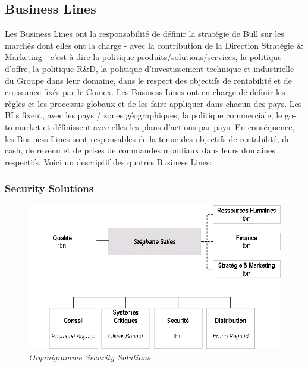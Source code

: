 \documentclass[11pt]{article}
\begin{document}
		\subsection{Business Lines}
		Les Business Lines ont la responsabilité de définir la stratégie de Bull sur les marchés 
		dont elles ont la charge - avec la contribution de la Direction Stratégie \& Marketing - 
		c’est-à-dire la politique produits/solutions/services, la politique d’offre, la politique R\&D, 
		la politique  d’investissement technique et industrielle du Groupe dans leur domaine, 
		dans le respect des objectifs de rentabilité et de croissance fixés par le Comex. \newline
		Les Business Lines ont en charge de définir les règles et les processus globaux et de les 
		faire appliquer dans chacun des pays. \newline
		Les BLs fixent, avec les pays / zones géographiques, la politique commerciale, le go-to-market et définissent avec 
		elles les plans d’actions par pays. \newline
		En conséquence, les Business Lines sont responsables de la tenue des objectifs de 
		rentabilité, de cash, de revenu et de prises de commandes mondiaux dans leurs 
		domaines respectifs. \newline
		Voici un descriptif des quatres Business Lines:

		\subsubsection{Security Solutions}
		\begin{figure}[h!]
		\centering \includegraphics[scale=0.4]{orga_secusol.png}
		\caption{\it Organigramme Security Solutions}
		\end{figure}
\end{document}
